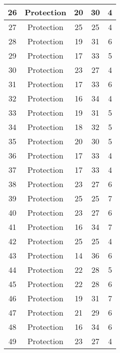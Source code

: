 \documentclass[results.tex]{subfiles}
\begin{document}
\begin{center}
\begin{tabular}{| c || c | c | c | c |}
    \hline
    26 & Protection & 20 & 30 & 4 \\ 
    \hline
    27 & Protection & 25 & 25 & 4 \\ 
    \hline
    28 & Protection & 19 & 31 & 6 \\ 
    \hline
    29 & Protection & 17 & 33 & 5 \\ 
    \hline
    30 & Protection & 23 & 27 & 4 \\ 
    \hline
    31 & Protection & 17 & 33 & 6 \\ 
    \hline
    32 & Protection & 16 & 34 & 4 \\ 
    \hline
    33 & Protection & 19 & 31 & 5 \\ 
    \hline
    34 & Protection & 18 & 32 & 5 \\ 
    \hline
    35 & Protection & 20 & 30 & 5 \\ 
    \hline
    36 & Protection & 17 & 33 & 4 \\ 
    \hline
    37 & Protection & 17 & 33 & 4 \\ 
    \hline
    38 & Protection & 23 & 27 & 6 \\ 
    \hline
    39 & Protection & 25 & 25 & 7 \\ 
    \hline
    40 & Protection & 23 & 27 & 6 \\ 
    \hline
    41 & Protection & 16 & 34 & 7 \\ 
    \hline
    42 & Protection & 25 & 25 & 4 \\ 
    \hline
    43 & Protection & 14 & 36 & 6 \\ 
    \hline
    44 & Protection & 22 & 28 & 5 \\ 
    \hline
    45 & Protection & 22 & 28 & 6 \\ 
    \hline
    46 & Protection & 19 & 31 & 7 \\ 
    \hline
    47 & Protection & 21 & 29 & 6 \\ 
    \hline
    48 & Protection & 16 & 34 & 6 \\ 
    \hline
    49 & Protection & 23 & 27 & 4 \\ 
    \hline   \end{tabular}
\end{center}
\end{document}
